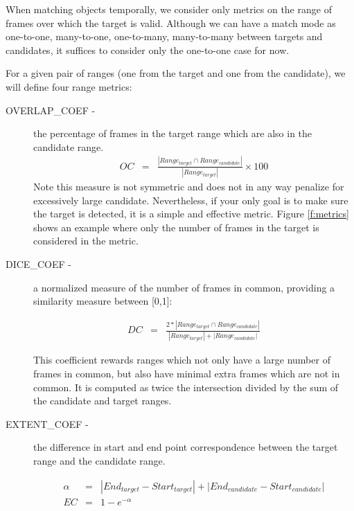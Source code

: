 When matching objects temporally, we consider only metrics on the
range of frames over which the target is valid. Although we can have a
match mode as one-to-one, many-to-one, one-to-many, many-to-many
between targets and candidates, it suffices to consider only the
one-to-one case for now.

For a given pair of ranges (one from the target and one from the
candidate), we will define four range metrics:

\begin {description}
\item [OVERLAP\_COEF -] the percentage of frames in the target range which are also in the candidate range. 
\begin{eqnarray}
        OC  & = & \frac{|Range_{target} \cap Range_{candidate}|}
                        {|Range_{target}|} \times 100%
\end{eqnarray}
Note this measure is not symmetric and does not in any way penalize
for excessively large candidate.  Nevertheless, if your only goal is
to make sure the target is detected, it is a simple and effective
metric.  Figure \ref{f:metrics} shows an example where only the number
of frames in the target is considered in the metric.


\item [DICE\_COEF -] a normalized measure of  the number of frames in common, providing a similarity measure between [0,1]:

\begin{eqnarray}
        DC  & = & \frac{2 * |Range_{target} \cap Range_{candidate}|}
                        {|Range_{target}| + |Range_{candidate}|}
\end{eqnarray}

This coefficient rewards ranges which not only have a large number of
frames in common, but also have minimal extra frames which are not in
common.  It is computed as twice the intersection divided by the sum of the candidate and target ranges.


\item [EXTENT\_COEF -] the difference in start and end point
correspondence between the target range and the candidate range.

\begin{eqnarray}
      \alpha & = &  {|End_{target} - Start_{target}|} +{|End_{candidate} - Start_{candidate}|} \\
      EC  & = &  1 - e^{-\alpha}
\end{eqnarray}


\end{description}
